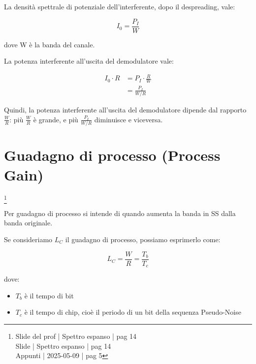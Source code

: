 La densità spettrale di potenziale dell'interferente, 
dopo il despreading, vale: 

{
    \Large 
    \begin{equation}
        I_0 
        =
        \frac{P_I}{W}
    \end{equation}
}

dove W è la banda del canale. \newline 

La potenza interferente all'uscita del demodulatore vale: 

{
    \Large 
    \begin{equation}
        \begin{split}
            I_0 \cdot R 
            &=
            P_I \cdot \frac{R}{W}
            \\
            &= 
            \frac{P_I}{W / R}
        \end{split}
    \end{equation}
}

Quindi, la potenza interferente all'uscita del demodulatore dipende dal rapporto $\frac{W}{R}$: 
più $\frac{W}{R}$ è grande, e più $\frac{P_I}{W / R}$ diminuisce e viceversa. \newline 

\newpage 

\section{Guadagno di processo (Process Gain)}
\footnote{Slide del prof | Spettro espanso | pag 14 \\
Slide | Spettro espanso | pag 14 \\
Appunti | 2025-05-09 | pag 5
} 

Per guadagno di processo si intende di quando aumenta la banda in SS dalla banda originale. \newline 

Se consideriamo $L_C$ il guadagno di processo, 
possiamo esprimerlo come: 

{
    \Large 
    \begin{equation}
        L_C = \frac{W}{R} = \frac{T_b}{T_c}
    \end{equation}
}

dove: 

\begin{itemize}
    \item $T_b$ è il tempo di bit 
    \item $T_c$ è il tempo di chip, cioè il periodo di un bit della sequenza Pseudo-Noise
\end{itemize}

